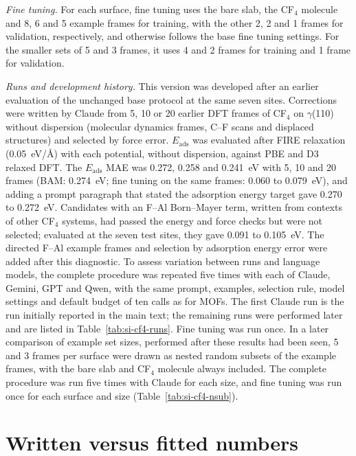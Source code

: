 \textit{Fine tuning.} For each surface, fine tuning uses the bare slab, the CF$_4$ molecule and 8, 6 and 5 example frames for training, with the other 2, 2 and 1 frames for validation, respectively, and otherwise follows the base fine tuning settings. For the smaller sets of 5 and 3 frames, it uses 4 and 2 frames for training and 1 frame for validation.

\textit{Runs and development history.} This version was developed after an earlier evaluation of the unchanged base protocol at the same seven sites. Corrections were written by Claude from 5, 10 or 20 earlier DFT frames of CF$_4$ on $\gamma$(110) without dispersion (molecular dynamics frames, C--F scans and displaced structures) and selected by force error. $E_\mathrm{ads}$ was evaluated after FIRE relaxation (0.05~eV/\AA) with each potential, without dispersion, against PBE and D3 relaxed DFT. The $E_\mathrm{ads}$ MAE was 0.272, 0.258 and 0.241~eV with 5, 10 and 20 frames (BAM: 0.274~eV; fine tuning on the same frames: 0.060 to 0.079~eV), and adding a prompt paragraph that stated the adsorption energy target gave 0.270 to 0.272~eV. Candidates with an F--Al Born--Mayer term, written from contexts of other CF$_4$ systems, had passed the energy and force checks but were not selected; evaluated at the seven test sites, they gave 0.091 to 0.105~eV. The directed F--Al example frames and selection by adsorption energy error were added after this diagnostic. To assess variation between runs and language models, the complete procedure was repeated five times with each of Claude, Gemini, GPT and Qwen, with the same prompt, examples, selection rule, model settings and default budget of ten calls as for MOFs. The first Claude run is the run initially reported in the main text; the remaining runs were performed later and are listed in Table~\ref{tab:si-cf4-runs}. Fine tuning was run once. In a later comparison of example set sizes, performed after these results had been seen, 5 and 3 frames per surface were drawn as nested random subsets of the example frames, with the bare slab and CF$_4$ molecule always included. The complete procedure was run five times with Claude for each size, and fine tuning was run once for each surface and size (Table~\ref{tab:si-cf4-nsub}).

\FloatBarrier
\clearpage
\ifbulk
\section{Written versus fitted numbers}
\label{si:fit}

